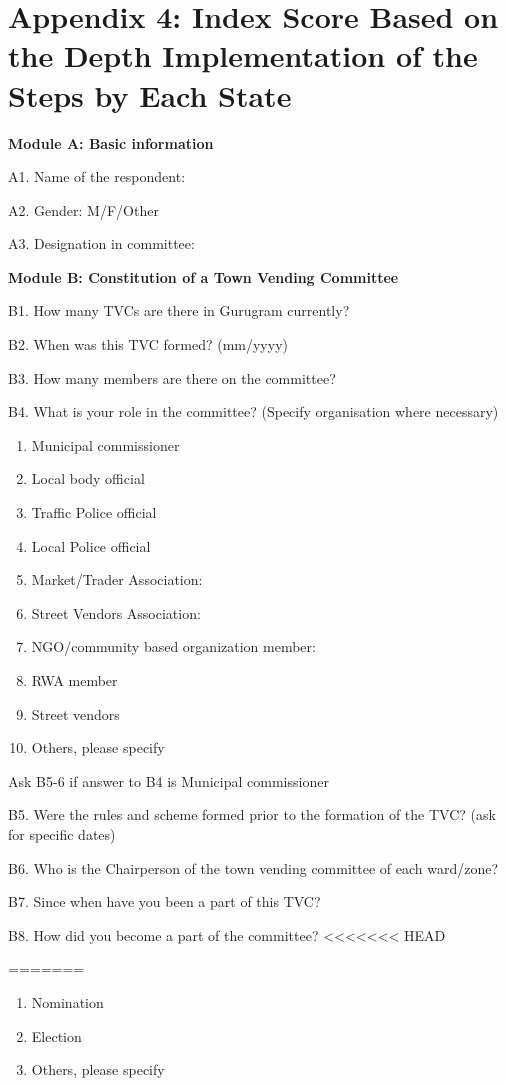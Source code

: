 \documentclass[a4paper, 12pt, twoside]{article}
\begin{document}
{{%
\section*{Appendix 4: Index Score Based on the Depth Implementation of the Steps by Each State}

\begin{mdframed}[backgroundcolor=gray!20]
\textbf{Module A: Basic information}

A1. Name of the respondent:

A2. Gender: M/F/Other

A3. Designation in committee:


\textbf{Module B: Constitution of a Town Vending Committee}

B1. How many TVCs are there in Gurugram currently?

B2. When was this TVC formed? (mm/yyyy)

B3. How many members are there on the committee?

B4. What is your role in the committee? (Specify organisation where necessary)

\begin{enumerate}[nosep]
\item Municipal commissioner
\item Local body official
\item Traffic Police official
\item Local Police official
\item Market/Trader Association:
\item Street Vendors Association:
\item NGO/community based organization member:
\item RWA member
\item Street vendors
\item Others, please specify
\end{enumerate}

Ask B5-6 if answer to B4 is Municipal commissioner

B5. Were the rules and scheme formed prior to the formation of the TVC? (ask for specific dates)

B6. Who is the Chairperson of the town vending committee of each ward/zone?

B7. Since when have you been a part of this TVC?

B8. How did you become a part of the committee?
<<<<<<< HEAD
\begin{enumerate}
=======
\begin{enumerate}[nosep]
>>>>>>> 5b007322ba2df55649fdbe03de9d7609dbc86c7c
\item Nomination
\item Election
\item Others, please specify
\end{enumerate}


\end{enumerate}
\end{mdframed}}}
\end{document}
